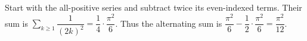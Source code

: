 Start with the all-positive series and subtract twice its even-indexed terms. Their sum is $\sum_{k\ge1}\dfrac{1}{(2k)^2}=\dfrac{1}{4}\cdot\dfrac{\pi^2}{6}$. Thus the alternating sum is $\dfrac{\pi^2}{6}-\dfrac{1}{2}\cdot\dfrac{\pi^2}{6}=\boxed{\dfrac{\pi^2}{12}}$.

